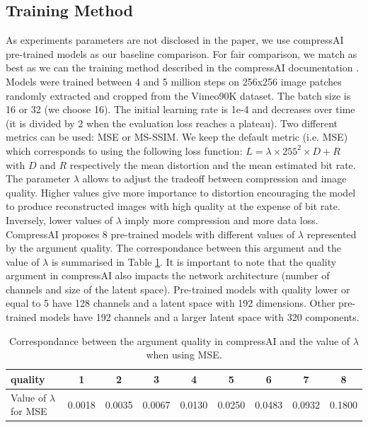 \subsection{Training Method}
\label{training_method}
As experiments parameters are not disclosed in the paper, we use compressAI pre-trained models as our baseline comparison. For fair comparison, we match as best as we can the training method described in the compressAI documentation \cite{compressai_train}. Models were trained between 4 and 5 million steps on 256x256 image patches randomly extracted and cropped from the Vimeo90K dataset. The batch size is 16 or 32 (we choose 16). The initial learning rate is 1e-4 and decreases over time (it is divided by 2 when the evaluation loss reaches a plateau). Two different metrics can be used: MSE or MS-SSIM. We keep the default metric (i.e. MSE) which corresponds to using the following loss function: \(L = \lambda \times 255^{2} \times D + R\) with \(D\) and \(R\) respectively the mean distortion and the mean estimated bit rate. The parameter \(\lambda\) allows to adjust the tradeoff between compression and image quality. Higher values give more importance to distortion encouraging the model to produce reconstructed images with high quality at the expense of bit rate. Inversely, lower values of \(\lambda\) imply more compression and more data loss. CompressAI proposes 8 pre-trained models with different values of \(\lambda\) represented by the argument \textsf{quality}. The correspondance between this argument and the value of \(\lambda\) is summarised in Table \ref{tab_quality_lambda}. It is important to note that the \textsf{quality} argument in compressAI also impacts the network architecture (number of channels and size of the latent space). Pre-trained models with \textsf{quality} lower or equal to 5 have 128 channels and a latent space with 192 dimensions. Other pre-trained models have 192 channels and a larger latent space with 320 components. 

\begin{table}[]
    \centering
    \begin{tabular}{|l|c|c|c|c|c|c|c|c|}
    \hline
    \textsf{quality}             & 1 & 2 & 3 & 4 & 5 & 6 & 7 & 8 \\ \hline
    Value of \(\lambda\) for MSE & 0.0018 & 0.0035 & 0.0067 & 0.0130 & 0.0250 & 0.0483 & 0.0932 & 0.1800 \\ \hline
    \end{tabular}
    \caption{Correspondance between the argument \textsf{quality} in compressAI and the value of \(\lambda\) when using MSE.}
    \label{tab_quality_lambda}
\end{table}

